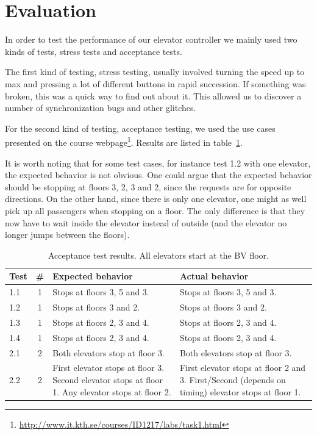 \documentclass[a4paper]{article}
\begin{document}
\section{Evaluation}

In order to test the performance of our elevator controller we mainly used two
kinds of tests, stress tests and acceptance tests.

The first kind of testing, stress testing, usually involved turning the speed up
to max and pressing a lot of different buttons in rapid succession. If something
was broken, this was a quick way to find out about it. This allowed us to
discover a number of synchronization bugs and other glitches.

For the second kind of testing, acceptance testing, we used the use cases
presented on the course
webpage\footnote{\url{http://www.it.kth.se/courses/ID1217/labs/task1.html}}.
Results are listed in table~\ref{tab:acceptance_test_results}.

It is worth noting that for some test cases, for instance test 1.2 with one
elevator, the expected behavior is not obvious. One could argue that the
expected behavior should be stopping at floors 3, 2, 3 and 2, since the requests
are for opposite directions. On the other hand, since there is only one
elevator, one might as well pick up all passengers when stopping on a floor. The
only difference is that they now have to wait inside the elevator instead of
outside (and the elevator no longer jumps between the floors).

\begin{table}[h]
    \begin{tabular}{| l | c | p{4.7cm} | p{4.7cm} |}
        \hline
        Test & \# & Expected behavior & Actual behavior \\
        \hline
        1.1 & 1 &
            Stops at floors 3, 5 and 3. &
            Stops at floors 3, 5 and 3. \\
        1.2 & 1 &
            Stops at floors 3 and 2. &
            Stops at floors 3 and 2. \\
        1.3 & 1 &
            Stops at floors 2, 3 and 4. &
            Stops at floors 2, 3 and 4. \\
        1.4 & 1 &
            Stops at floors 2, 3 and 4. &
            Stops at floors 2, 3 and 4. \\
        2.1 & 2 &
            Both elevators stop at floor 3. &
            Both elevators stop at floor 3. \\
        2.2 & 2 &
            First elevator stops at floor 3.
                Second elevator stops at floor 1.
                Any elevator stops at floor 2. &
            First elevator stops at floor 2 and 3.
            First/Second (depends on timing) elevator stops at floor 1. \\
        \hline
    \end{tabular}
    \caption{Acceptance test results. All elevators start at the BV floor.}
    \label{tab:acceptance_test_results}
\end{table}
\end{document}
